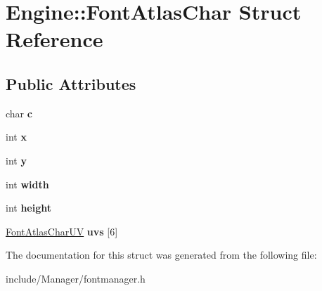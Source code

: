 \hypertarget{structEngine_1_1FontAtlasChar}{}\section{Engine\+:\+:Font\+Atlas\+Char Struct Reference}
\label{structEngine_1_1FontAtlasChar}
\subsection*{Public Attributes}
\begin{DoxyCompactItemize}
\item 
\hypertarget{structEngine_1_1FontAtlasChar_ae21676ec3c222978a599253640a5d95c}{}char {\bfseries c}\label{structEngine_1_1FontAtlasChar_ae21676ec3c222978a599253640a5d95c}

\item 
\hypertarget{structEngine_1_1FontAtlasChar_a7f7ec1fbf9e308f0830d76b582db7c57}{}int {\bfseries x}\label{structEngine_1_1FontAtlasChar_a7f7ec1fbf9e308f0830d76b582db7c57}

\item 
\hypertarget{structEngine_1_1FontAtlasChar_a636dc075713ff5c39d987fdfc797e3ab}{}int {\bfseries y}\label{structEngine_1_1FontAtlasChar_a636dc075713ff5c39d987fdfc797e3ab}

\item 
\hypertarget{structEngine_1_1FontAtlasChar_a63c13ae908a240e99f72c9cb4d290c25}{}int {\bfseries width}\label{structEngine_1_1FontAtlasChar_a63c13ae908a240e99f72c9cb4d290c25}

\item 
\hypertarget{structEngine_1_1FontAtlasChar_a1fe101155e2e13d23e9cf201d45a0f6e}{}int {\bfseries height}\label{structEngine_1_1FontAtlasChar_a1fe101155e2e13d23e9cf201d45a0f6e}

\item 
\hypertarget{structEngine_1_1FontAtlasChar_acaffee47030747472c56c712953becda}{}\hyperlink{structEngine_1_1FontAtlasCharUV}{Font\+Atlas\+Char\+U\+V} {\bfseries uvs} \mbox{[}6\mbox{]}\label{structEngine_1_1FontAtlasChar_acaffee47030747472c56c712953becda}

\end{DoxyCompactItemize}


The documentation for this struct was generated from the following file\+:\begin{DoxyCompactItemize}
\item 
include/\+Manager/fontmanager.\+h\end{DoxyCompactItemize}
